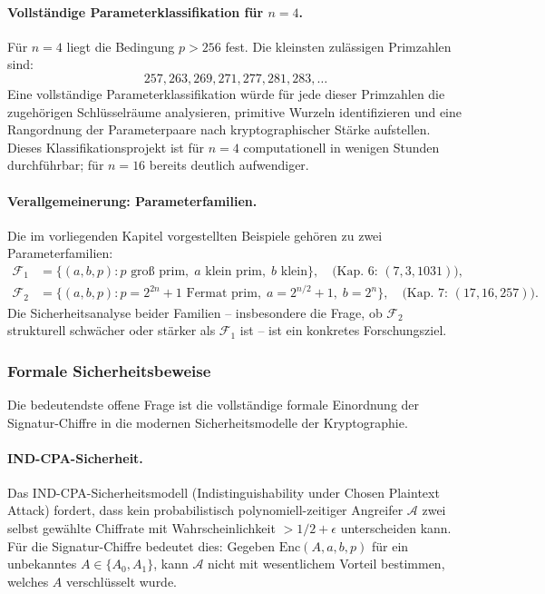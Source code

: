 ﻿\documentclass[a4paper,12pt]{scrreprt}
\theoremstyle{definition}
\begin{document}
\paragraph{Vollständige Parameterklassifikation für $n = 4$.}
Für $n = 4$ liegt die Bedingung $p > 256$ fest. Die kleinsten zulässigen Primzahlen sind:
\[
257, 263, 269, 271, 277, 281, 283, \ldots
\]
Eine vollständige Parameterklassifikation würde für jede dieser Primzahlen die zugehörigen Schlüsselräume analysieren, primitive Wurzeln identifizieren und eine Rangordnung der Parameterpaare nach kryptographischer Stärke aufstellen. Dieses Klassifikationsprojekt ist für $n=4$ computationell in wenigen Stunden durchführbar; für $n=16$ bereits deutlich aufwendiger.

\paragraph{Verallgemeinerung: Parameterfamilien.}
Die im vorliegenden Kapitel vorgestellten Beispiele gehören zu zwei Parameterfamilien:
\begin{align*}
\mathcal{F}_1 &= \{(a, b, p) : p \text{ groß prim},\; a \text{ klein prim},\; b \text{ klein}\}, \quad \text{(Kap.~6: $(7,3,1031)$)},\\
\mathcal{F}_2 &= \{(a, b, p) : p = 2^{2n}+1 \text{ Fermat prim},\; a = 2^{n/2}+1,\; b = 2^n\}, \quad \text{(Kap.~7: $(17,16,257)$)}.
\end{align*}
Die Sicherheitsanalyse beider Familien -- insbesondere die Frage, ob $\mathcal{F}_2$ strukturell schwächer oder stärker als $\mathcal{F}_1$ ist -- ist ein konkretes Forschungsziel.

\subsubsection{Formale Sicherheitsbeweise}

Die bedeutendste offene Frage ist die vollständige formale Einordnung der Signatur-Chiffre in die modernen Sicherheitsmodelle der Kryptographie.

\paragraph{IND-CPA-Sicherheit.}
Das IND-CPA-Sicherheitsmodell (Indistinguishability under Chosen Plaintext Attack) \cite{GM84} fordert, dass kein probabilistisch polynomiell-zeitiger Angreifer $\mathcal{A}$ zwei selbst gewählte Chiffrate mit Wahrscheinlichkeit $> 1/2 + \epsilon$ unterscheiden kann. Für die Signatur-Chiffre bedeutet dies: Gegeben $\mathrm{Enc}(A, a, b, p)$ für ein unbekanntes $A \in \{A_0, A_1\}$, kann $\mathcal{A}$ nicht mit wesentlichem Vorteil bestimmen, welches $A$ verschlüsselt wurde.
\end{document}
